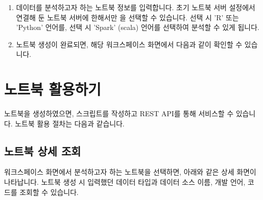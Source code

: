 \documentclass[letterpaper,10pt,english]{sphinxmanual}
\begin{document}
\begin{enumerate}
\item {} 
데이터를 분석하고자 하는 노트북 정보를 입력합니다. 초기 노트북 서버 설정에서 연결해 둔 노트북 서버에 한해서만 을 선택할 수 있습니다.  선택 시 'R' 또는 'Python' 언어를,  선택 시 'Spark' (scala) 언어를 선택하여 분석할 수 있게 됩니다.
\begin{quote}

\begin{figure}[H]
\centering

\noindent{}
\end{figure}
\end{quote}

\item {} 
노트북 생성이 완료되면, 해당 워크스페이스 화면에서 다음과 같이 확인할 수 있습니다.
\begin{quote}

\begin{figure}[H]
\centering

\noindent{}
\end{figure}
\end{quote}

\end{enumerate}


\section{노트북 활용하기}
\label{\detokenize{discovery/part05/use_a_notebook:id1}}\label{\detokenize{discovery/part05/use_a_notebook::doc}}
노트북을 생성하였으면, 스크립트를 작성하고 REST API를 통해 서비스할 수 있습니다. 노트북 활용 절차는 다음과 같습니다.


\subsection{노트북 상세 조회}
\label{\detokenize{discovery/part05/use_a_notebook:id2}}
워크스페이스 화면에서 분석하고자 하는 노트북을 선택하면, 아래와 같은 상세 화면이 나타납니다. 노트북 생성 시 입력했던 데이터 타입과 데이터 소스 이름, 개발 언어, 코드를 조회할 수 있습니다.
\begin{quote}

\begin{figure}[H]
\centering

\noindent{}
\end{figure}
\end{quote}
\end{document}

